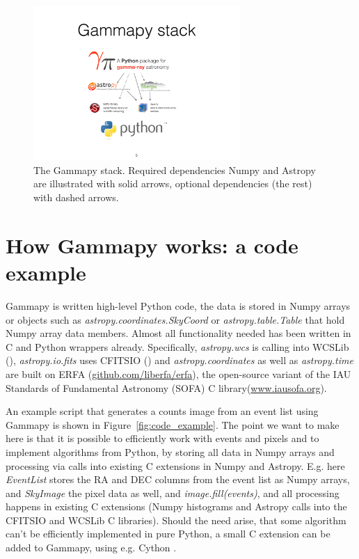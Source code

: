 \documentclass{PoS}
\newcommand{\urlErfa}{\href{https://github.com/liberfa/erfa}{github.com/liberfa/erfa}}
\newcommand{\urlSofa}{\href{http://www.iausofa.org}{www.iausofa.org}}
\begin{document}
\begin{figure}[t]
\centering
\includegraphics[width=0.7\textwidth]{figures/gammapy-stack}
\caption{
The Gammapy stack. Required dependencies Numpy and Astropy are illustrated with
solid arrows, optional dependencies (the rest) with dashed arrows.
}
\label{fig:stack} \end{figure}

\section{How Gammapy works: a code example}
\label{sec:code}

Gammapy is written high-level Python code, the data is stored in Numpy arrays or
objects such as {\it astropy.coordinates.SkyCoord} or {\it astropy.table.Table}
that hold Numpy array data members. Almost all functionality needed has been
written in C and Python wrappers already. Specifically, {\it astropy.wcs} is
calling into WCSLib (\cite{wcslib}), {\it astropy.io.fits} uses CFITSIO
(\cite{cfitsio}) and {\it astropy.coordinates} as well as {\it astropy.time} are
built on ERFA (\urlErfa), the open-source variant of the IAU Standards of
Fundamental Astronomy (SOFA) C library\linebreak (\urlSofa).

An example script that generates a counts image from an event list using Gammapy
is shown in Figure~\ref{fig:code_example}. The point we want to
make here is that it is possible to efficiently work with events and pixels and
to implement algorithms from Python, by storing all data in Numpy arrays and
processing via calls into existing C extensions in Numpy and Astropy. E.g. here
{\it EventList} stores the RA and DEC columns from the event list as Numpy
arrays, and {\it SkyImage} the pixel data as well, and {\it image.fill(events)},
and all processing happens in existing C extensions (Numpy histograms and
Astropy calls into the CFITSIO and WCSLib C libraries). Should the need arise,
that some algorithm can't be efficiently implemented in pure Python, a small C
extension can be added to Gammapy, using e.g. Cython \cite{cython}.
\end{document}
